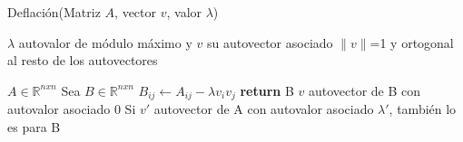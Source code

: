 
\begin{algorithm}[H]
\caption{Deflación(Matriz $A$, vector $v$, valor $\lambda$)}
\label{pseudo:deflacion}
\begin{algorithmic}
\REQUIRE $\lambda$ autovalor de módulo máximo y $v$ su autovector asociado 
\REQUIRE $\|v\|$=1 y ortogonal al resto de los autovectores

\REQUIRE $A \in \mathbb{R}^{nxn}$
\STATE Sea $B \in \mathbb{R}^{nxn}$
		\STATE $B_{ij} \leftarrow A_{ij} - \lambda v_{i} v_{j}$
	\ENDFOR
\ENDFOR
\STATE \textbf{return} B
\ENSURE $v$ autovector de B con autovalor asociado 0
\ENSURE Si $v'$ autovector de A con autovalor asociado $\lambda '$, también lo es para B
\end{algorithmic}
\end{algorithm}
